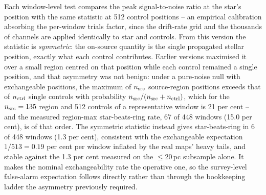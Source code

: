 \documentclass{openjournal}
\begin{document}
Each window-level test compares the peak signal-to-noise ratio at the
star's position with the same statistic at 512 control positions --
an empirical calibration absorbing the per-window trials factor, since
the drift-rate grid and the thousands of channels are applied
identically to star and controls. From this version the statistic is
\emph{symmetric}: the on-source quantity is the single propagated
stellar position, exactly what each control contributes. Earlier
versions maximised it over a small region centred on that position
while each control remained a single position, and that asymmetry was
not benign: under a pure-noise null with exchangeable positions, the
maximum of $n_{\rm src}$ source-region positions exceeds that of
$n_{\rm ctrl}$ single controls with probability
$n_{\rm src}/(n_{\rm src}+n_{\rm ctrl})$, which for the
$n_{\rm src}=135$ region and 512 controls of a representative window
is 21 per cent -- and the measured region-max star-beats-ring rate,
67 of 448 windows (15.0 per cent), is of that order. The symmetric
statistic instead gives star-beats-ring in 6 of 448 windows (1.3 per
cent), consistent with the exchangeable expectation $1/513=0.19$ per
cent per window inflated by the real maps' heavy tails, and stable
against the 1.3 per cent measured on the $\le$20\,pc subsample alone.
It makes the nominal exchangeability rate the operative one, so the
survey-level false-alarm expectation follows directly rather than
through the bookkeeping ladder the asymmetry previously required.
\end{document}
